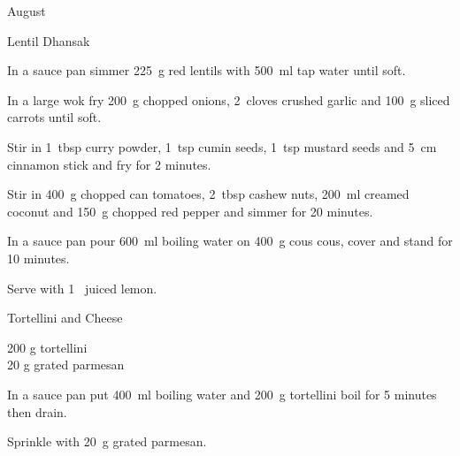 \begin{menu}{August}
\begin{recipe}{2}{Lentil Dhansak}
\begin{ingredients}
		\end{ingredients}
	
	
    \begin{instructions}
    \item 
        In a sauce pan simmer
        225~g  red lentils  
        with 500~ml  tap water
        until soft.      
      \item 
        In a large wok fry
        200~g chopped onions,
        2~cloves crushed garlic
        and
        100~g sliced carrots
        until soft.
      \item 
        Stir in
        1~tbsp  curry powder,
        1~tsp  cumin seeds,
        1~tsp  mustard seeds
        and
        5~cm  cinnamon stick
        and fry for 2 minutes.
      \item 
        Stir in
        400~g chopped can tomatoes,
        2~tbsp  cashew nuts,
        200~ml  creamed coconut
        and
        150~g chopped red pepper
        and simmer for 20 minutes.
      \item 
      In a
      sauce pan pour 600~ml  boiling water
      on 400~g  cous cous, cover and
      stand for 10 minutes.
    \item 
        Serve with
        1~ juiced lemon.
      
    \end{instructions}
    \end{recipe}%
  
    \begin{recipe}{1}{Tortellini and Cheese}%
		\begin{ingredients}
		200 g tortellini  \\
	20 g grated parmesan  \\
	
		\end{ingredients}
	
    \begin{instructions}
    \item 
      In a
      sauce pan
      put
      400~ml  boiling water
      and
      200~g  tortellini
      boil for 5 minutes then drain.
    \item 
        Sprinkle with
        20~g  grated parmesan.
      
    \end{instructions}
    \end{recipe}%
  
    \clearpage
    \end{menu}
	
